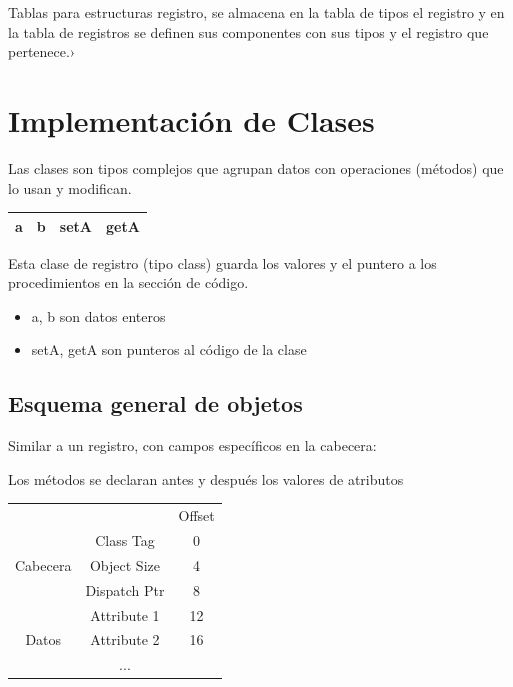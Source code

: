 \documentclass[12pt, twoside, openright]{report} %
\begin{document}
Tablas para estructuras registro, se almacena en la tabla de tipos el registro y en la tabla de registros se definen sus componentes con sus tipos y el registro que pertenece.›
\begin{figure}[H]
  {\def\svgwidth{.9\textwidth}
  }
\end{figure}

\section{Implementación de Clases}
Las clases son tipos complejos que agrupan datos con operaciones (métodos) que lo usan y modifican.

\begin{table}[h]
  \begin{tabular}{|c|c|c|c|}
  \hline
  a & b & setA & getA \\ \hline
  \end{tabular}
\end{table}

Esta clase de registro (tipo class) guarda los valores y el puntero a los procedimientos en la sección de código.
\begin{itemize}
  \item a,  b son datos enteros
  \item setA, getA son punteros al código de la clase
\end{itemize}

\subsection{Esquema general de objetos}
Similar a un registro, con campos específicos en la cabecera:

Los métodos se declaran antes y después los valores de atributos

\begin{table}[h]
  \begin{tabular}{ccc}
                                                 &                                   & Offset \\ \cline{2-2}
  \multicolumn{1}{c|}{\multirow{3}{*}{Cabecera}} & \multicolumn{1}{c|}{Class Tag}    & 0      \\ \cline{2-2}
  \multicolumn{1}{c|}{}                          & \multicolumn{1}{c|}{Object Size}  & 4      \\ \cline{2-2}
  \multicolumn{1}{c|}{}                          & \multicolumn{1}{c|}{Dispatch Ptr} & 8      \\ \cline{2-2}
  \multicolumn{1}{c|}{\multirow{3}{*}{Datos}}    & \multicolumn{1}{c|}{Attribute 1}  & 12     \\ \cline{2-2}
  \multicolumn{1}{c|}{}                          & \multicolumn{1}{c|}{Attribute 2}  & 16     \\ \cline{2-2}
  \multicolumn{1}{c|}{}                          & \multicolumn{1}{c|}{...}          &        \\ \cline{2-2}
  \end{tabular}
\end{table}
\end{document}
